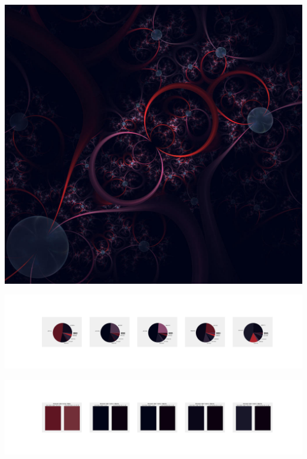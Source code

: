 \documentclass[11pt]{article}
\begin{document}
\begin{landscape}
    \begin{center}
    \includegraphics[width=\textwidth]{./nbimg/file (82).jpg}
    \end{center}

    \begin{center}
    \includegraphics[width=250mm]{./nbimg/pie-432.jpg}
    \end{center}

    \begin{center}
    \includegraphics[width=250mm]{./nbimg/peak-432.jpg}
    \end{center}
    


\end{landscape}
\end{document}
